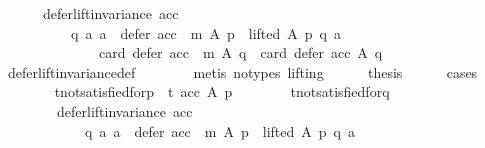 \begin{isabellebody}
\ \ \ \ \ \ {\isachardoublequoteopen}defer{\isacharunderscore}{\kern0pt}lift{\isacharunderscore}{\kern0pt}invariance\ {\isacharparenleft}{\kern0pt}acc{\isacharparenright}{\kern0pt}\ {\isasymlongrightarrow}\isanewline
\ \ \ \ \ \ \ \ \ \ {\isacharparenleft}{\kern0pt}{\isasymforall}q\ a{\isachardot}{\kern0pt}\ {\isacharparenleft}{\kern0pt}a\ {\isasymin}\ {\isacharparenleft}{\kern0pt}defer\ {\isacharparenleft}{\kern0pt}acc\ {\isasymtriangleright}\ m{\isacharparenright}{\kern0pt}\ A\ p{\isacharparenright}{\kern0pt}\ {\isasymand}\ lifted\ A\ p\ q\ a{\isacharparenright}{\kern0pt}\ {\isasymlongrightarrow}\isanewline
\ \ \ \ \ \ \ \ \ \ \ \ \ \ {\isacharparenleft}{\kern0pt}card\ {\isacharparenleft}{\kern0pt}defer\ {\isacharparenleft}{\kern0pt}acc\ {\isasymtriangleright}\ m{\isacharparenright}{\kern0pt}\ A\ q{\isacharparenright}{\kern0pt}\ {\isacharless}{\kern0pt}\ card\ {\isacharparenleft}{\kern0pt}defer\ acc\ A\ q{\isacharparenright}{\kern0pt}{\isacharparenright}{\kern0pt}{\isacharparenright}{\kern0pt}{\isachardoublequoteclose}\isanewline
\ \ \ \ \ \ \isamarkupfalse%
\ defer{\isacharunderscore}{\kern0pt}lift{\isacharunderscore}{\kern0pt}invariance{\isacharunderscore}{\kern0pt}def\isanewline
\ \ \ \ \ \ \isamarkupfalse%
\ {\isacharparenleft}{\kern0pt}metis\ {\isacharparenleft}{\kern0pt}no{\isacharunderscore}{\kern0pt}types{\isacharcomma}{\kern0pt}\ lifting{\isacharparenright}{\kern0pt}{\isacharparenright}{\kern0pt}\isanewline
\ \ \ \ \isamarkupfalse%
\ {\isacharquery}{\kern0pt}thesis\isanewline
\ \ \ \ \isamarkupfalse%
\ cases\isanewline
\ \ \ \ \ \ \isamarkupfalse%
\ t{\isacharunderscore}{\kern0pt}not{\isacharunderscore}{\kern0pt}satisfied{\isacharunderscore}{\kern0pt}for{\isacharunderscore}{\kern0pt}p{\isacharcolon}{\kern0pt}\ {\isachardoublequoteopen}{\isasymnot}\ t\ {\isacharparenleft}{\kern0pt}acc\ A\ p{\isacharparenright}{\kern0pt}{\isachardoublequoteclose}\isanewline
\ \ \ \ \ \ \isamarkupfalse%
\ t{\isacharunderscore}{\kern0pt}not{\isacharunderscore}{\kern0pt}satisfied{\isacharunderscore}{\kern0pt}for{\isacharunderscore}{\kern0pt}q{\isacharcolon}{\kern0pt}\isanewline
\ \ \ \ \ \ \ \ {\isachardoublequoteopen}defer{\isacharunderscore}{\kern0pt}lift{\isacharunderscore}{\kern0pt}invariance\ {\isacharparenleft}{\kern0pt}acc{\isacharparenright}{\kern0pt}\ {\isasymlongrightarrow}\isanewline
\ \ \ \ \ \ \ \ \ \ \ \ {\isacharparenleft}{\kern0pt}{\isasymforall}q\ a{\isachardot}{\kern0pt}\ {\isacharparenleft}{\kern0pt}a\ {\isasymin}\ {\isacharparenleft}{\kern0pt}defer\ {\isacharparenleft}{\kern0pt}acc\ {\isasymtriangleright}\ m{\isacharparenright}{\kern0pt}\ A\ p{\isacharparenright}{\kern0pt}\ {\isasymand}\ lifted\ A\ p\ q\ a{\isacharparenright}{\kern0pt}\ {\isasymlongrightarrow}\isanewline

\end{isabellebody}
